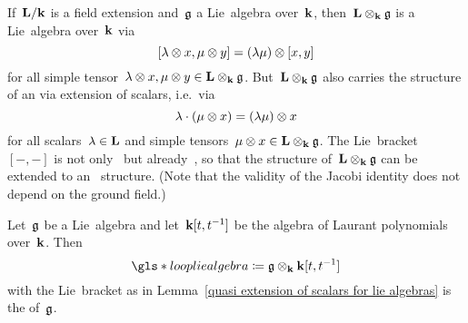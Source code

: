 \begin{example}
  If~$\mathbf{L}/\mathbf{k}$ is a field extension and~$\mathfrak{g}$ a Lie~algebra over~$\kf$, then~$\mathbf{L} \otimes_{\mathbf{k}} \mathfrak{g}$ is a Lie~algebra over~$\kf$ via
  \[
    [\lambda \otimes x, \mu \otimes y]
    = 
    (\lambda \mu) \otimes [x,y]
  \]
  for all simple tensor~$\lambda \otimes x, \mu \otimes y \in \mathbf{L} \otimes_{\mathbf{k}} \mathfrak{g}$.
  But~$\mathbf{L} \otimes_{\mathbf{k}} \mathfrak{g}$ also carries the structure of an {\vectorspace{$\Lf$}} via extension of scalars, i.e.\ via
  \[
    \lambda \cdot (\mu \otimes x)
    =
    (\lambda \mu) \otimes x
  \]
  for all scalars~$\lambda \in \mathbf{L}$ and simple tensors~$\mu \otimes x \in \mathbf{L} \otimes_{\mathbf{k}} \mathfrak{g}$.
  The Lie~bracket~$[-,-]$ is not only~{\bilinear{$\kf$}} but already~{\bilinear{$\Lf$}}, so that the {\liealgebra{$\kf$}} structure of~$\mathbf{L} \otimes_{\mathbf{k}} \mathfrak{g}$ can be extended to an~{\liealgebra{$\Lf$}} structure.
  (Note that the validity of the Jacobi identity does not depend on the ground field.)
\end{example}


\begin{definition}
  Let~$\mathfrak{g}$ be a Lie~algebra and let~$\mathbf{k}[t, t^{-1}]$ be the algebra of Laurant polynomials over~$\kf$.
  Then
  \[
    \gls*{loop lie algebra}
    \defined
    \glie \tensor_\kf \kf[t, t^{-1}]
  \]
  with the Lie~bracket as in Lemma~\ref{quasi extension of scalars for lie algebras} is the  of~$\mathfrak{g}$.
\end{definition}
 
